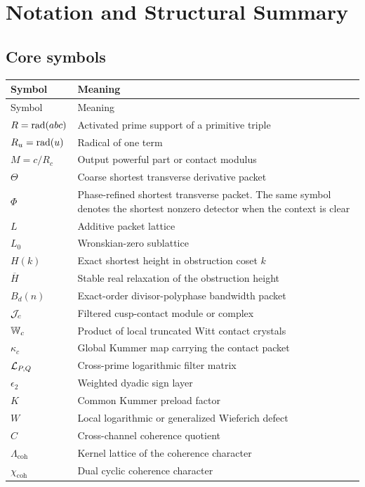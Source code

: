 \chapter{Notation and Structural Summary}

\section{Core symbols}
\begin{longtable}{L{0.18\textwidth}L{0.72\textwidth}}
\toprule
Symbol & Meaning\\
\midrule
\endfirsthead
\toprule
Symbol & Meaning\\
\midrule
\endhead
$R=\operatorname{rad}(abc)$ & Activated prime support of a primitive triple\\
$R_u=\operatorname{rad}(u)$ & Radical of one term\\
$M=c/R_c$ & Output powerful part or contact modulus\\
$\Theta$ & Coarse shortest transverse derivative packet\\
$\Phi$ & Phase-refined shortest transverse packet. The same symbol denotes the shortest nonzero detector when the context is clear\\
$L$ & Additive packet lattice\\
$L_0$ & Wronskian-zero sublattice\\
$H(k)$ & Exact shortest height in obstruction coset $k$\\
$\overline H$ & Stable real relaxation of the obstruction height\\
$B_d(n)$ & Exact-order divisor-polyphase bandwidth packet\\
$\mathcal J_c$ & Filtered cusp-contact module or complex\\
$\mathbb W_c$ & Product of local truncated Witt contact crystals\\
$\kappa_c$ & Global Kummer map carrying the contact packet\\
$\mathcal L_{P,Q}$ & Cross-prime logarithmic filter matrix\\
$\epsilon_2$ & Weighted dyadic sign layer\\
$K$ & Common Kummer preload factor\\
$W$ & Local logarithmic or generalized Wieferich defect\\
$C$ & Cross-channel coherence quotient\\
$\Lambda_{\mathrm{coh}}$ & Kernel lattice of the coherence character\\
$\chi_{\mathrm{coh}}$ & Dual cyclic coherence character\\
\bottomrule
\end{longtable}

